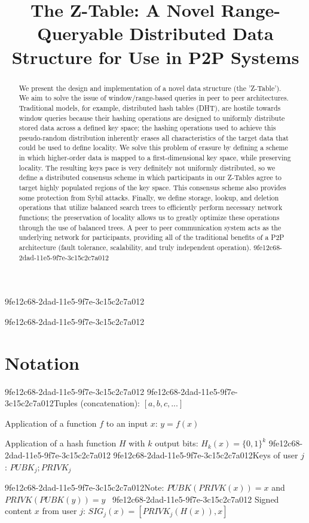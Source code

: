 \documentclass[12pt]{article}
\title{The Z-Table: A Novel Range-Queryable Distributed Data Structure for Use in P2P Systems}
\begin{document}
9fe12c68-2dad-11e5-9f7e-3c15c2c7a012
\maketitle

9fe12c68-2dad-11e5-9f7e-3c15c2c7a012\begin{abstract}
We present the design and implementation of a novel data structure (the 'Z-Table'). We aim to solve the issue of window/range-based queries in peer to peer architectures. Traditional models, for example,  distributed hash tables (DHT), are hostile towards window queries because their hashing operations are designed to uniformly distribute stored data across a defined key space; the hashing operations used to achieve this pseudo-random distribution inherently erases all characteristics of the target data that could be used to define locality. We solve this problem of erasure by defining a scheme in which higher-order data is mapped to a first-dimensional key space, while preserving locality. The resulting keys pace is very definitely not uniformly distributed, so we define a distributed consensus scheme in which participants in our Z-Tables agree to target highly populated regions of the key space. This consensus scheme also provides some protection from Sybil attacks. Finally, we define storage, lookup, and deletion operations that utilize balanced search trees to efficiently perform necessary network functions; the preservation of locality allows us to greatly optimize these operations through the use of balanced trees. A peer to peer communication system acts as the underlying network for participants, providing all of the traditional benefits of a P2P architecture (fault tolerance, scalability, and truly independent operation).
9fe12c68-2dad-11e5-9f7e-3c15c2c7a012\end{abstract}

\section{Notation}
9fe12c68-2dad-11e5-9f7e-3c15c2c7a012
9fe12c68-2dad-11e5-9f7e-3c15c2c7a012Tuples (concatenation): $[a,b,c,...]$

Application of a function $f$ to an input $x$: $y=f(x)$

Application of a hash function $H$ with $k$ output bits: $H_{k}(x) = \{0,1\}^k$
9fe12c68-2dad-11e5-9f7e-3c15c2c7a012
9fe12c68-2dad-11e5-9f7e-3c15c2c7a012Keys of user $j$: $ PUBK_j; PRIVK_j $

9fe12c68-2dad-11e5-9f7e-3c15c2c7a012Note: $PUBK(PRIVK(x)) = x$ and $PRIVK(PUBK(y)) = y$~
9fe12c68-2dad-11e5-9f7e-3c15c2c7a012
Signed content $x$ from user $j$: $SIG_j(x) = \left[ PRIVK_j( H(x) ), x \right]$
\end{document}
